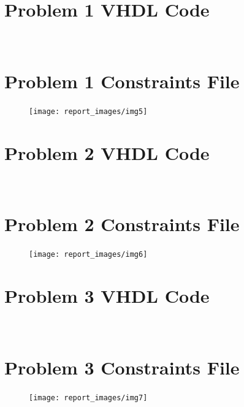\documentclass[11pt]{article}
\begin{document}
\begin{appendicies}
	
	\section{Problem 1 VHDL Code}
	
	\begin{lstlisting}[language=VHDL]
		
	\end{lstlisting}

	
	\section{Problem 1 Constraints File}
	
	\begin{figure}[h]
	\texttt{[image: report\_images/img5]}
	\end{figure}
	
	\section{Problem 2 VHDL Code}
	
	\begin{lstlisting}[language=VHDL]
		
	\end{lstlisting}
	
	\section{Problem 2 Constraints File}
	
	\begin{figure}[h]
	\texttt{[image: report\_images/img6]}
	\end{figure}
	
	\section{Problem 3 VHDL Code}
	
	\begin{lstlisting}[language=VHDL]
		
	\end{lstlisting}
	
	\section{Problem 3 Constraints File}
	
	\begin{figure}[h]
	\texttt{[image: report\_images/img7]}
	\end{figure}
	
\end{appendicies}
\end{document}
